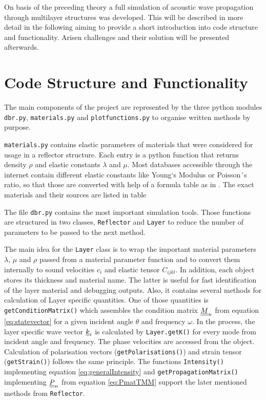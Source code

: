 On basis of the preceding theory a full simulation of acoustic wave propagation
through multilayer structures was developed. This will be
described in more detail in the following aiming to provide a short
introduction into code structure and functionality. Arisen challenges and their
solution will be presented afterwards.

\section{Code Structure and Functionality}
The main components of the project are represented by the three python modules
\texttt{dbr.py}, \texttt{materials.py} and \texttt{plotfunctions.py} to
organise written methods by purpose.

\texttt{materials.py} contains elastic parameters of materials that were
considered for usage in a reflector structure. Each entry is a python function
that returns density $\rho$ and elastic constants $\lambda$ and $\mu$. Most
databases accessible through the internet contain different elastic constants
like Young`s Modulus or Poisson´s ratio, so that those are converted with help
of a formula table as in \cite[30]{kundu2012ultrasonic} . The exact materials and their sources are listed in table

The file \texttt{dbr.py} contains the most important simulation tools. Those
functions are structured in two classes, \texttt{Reflector} and \texttt{Layer}
to reduce the number of parameters to be passed to the next method.

The main idea for the \texttt{Layer} class is to wrap the important material
parameters $\lambda$, $\mu$ and $\rho$ passed from a material parameter
function and to convert them internally to sound velocities $c_i$ and elastic
tensor $C_{ijkl}$. In addition, each object stores its thickness and material
name. The latter is useful for fast identification of the layer material and
debugging outputs.
Also, it contains several methods for calculation of Layer specific
quantities. One of those quantities is \texttt{getConditionMatrix()} which
assembles the condition matrix $\underline{\underline{M}}_n$ from equation
\ref{eq:statevector} for a given incident angle
$\theta$ and frequency $\omega$. In the process, the layer specific wave vector
$\underline{k}_i$ is calculated by \texttt{Layer.getK()} for every mode from
incident angle and frequency. The phase velocities are accessed from the
object. Calculation of polarisation vectors (\texttt{getPolarisations()}) and
strain tensor (\texttt{getStrain()}) follows the same principle. The functions
\texttt{Intensity()} implementing equation \ref{eq:generalIntensity} and
\texttt{getPropagationMatrix()} implementing $\underline{\underline{P}}_n$ from equation
\ref{eq:PmatTMM} support the later mentioned methods from
\texttt{Reflector}.

